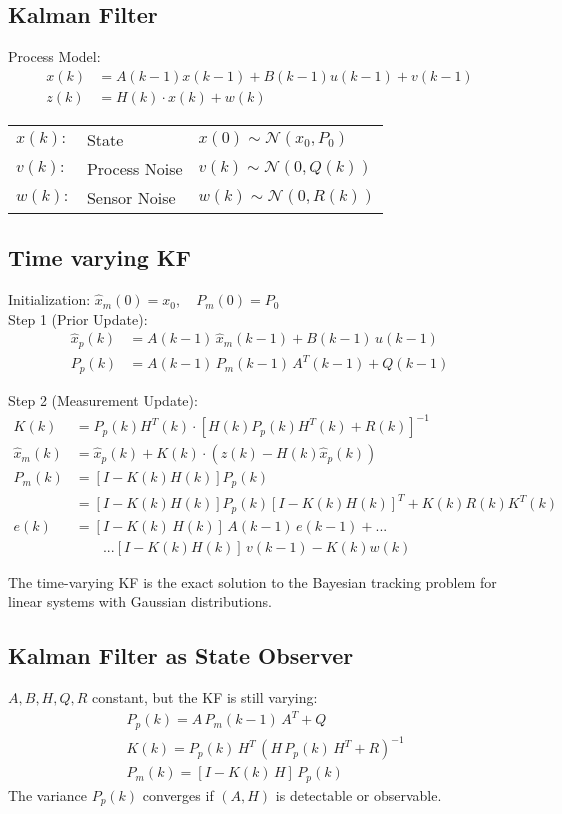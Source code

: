 \documentclass[landscape,a4paper,8pt]{scrartcl}
\begin{document}
\begin{multicols*}{3}
\section{Kalman Filter}
Process Model:
\begin{align*}
x(k) &= A(k-1) x(k-1) + B(k-1) u(k-1) + v(k-1) \\
z(k) &= H(k) \cdot x(k) + w(k)
\end{align*}
\begin{tabular}{lll}
$x(k):$ & State  & $x(0) \sim \mathcal{N}(x_0, P_0)$ \\
$v(k):$ & Process Noise & $v(k) \sim \mathcal{N}(0, Q(k))$\\
$w(k):$ & Sensor Noise & $w(k) \sim \mathcal{N}(0, R(k))$
\end{tabular}

\subsection{Time varying KF}
Initialization: $\hat{x}_m(0) = x_0, \quad P_m(0) = P_0$  \\
Step 1 (Prior Update):
\begin{align*}
\hat{x}_p (k) &= A(k-1) \, \hat{x}_m (k-1) + B(k-1) \, u(k-1) \\
P_p(k) &= A(k-1) \, P_m(k-1) \, A^T (k-1) + Q(k-1)
\end{align*}

Step 2 (Measurement Update):
\begin{align*}
K(k) &= P_p(k) H^T(k) \cdot [ H(k) P_p(k) H^T(k) + R(k)]^{-1} \\
\hat{x}_m(k) &= \hat{x}_p (k) + K(k) \cdot ( z(k) - H(k) \hat{x}_p(k)) \\
P_m (k) &=  [I-K(k) H(k)] P_p (k) \\
		&=  [I-K(k) H(k)] P_p (k) [I-K(k) H(k) ]^T + K(k) R(k) K^T (k)\\
e(k) &= [I - K(k)\, H(k)]\, A(k-1)\, e(k-1) + ...\\
	& \qquad ... [I-K(k) H(k)] \, v(k-1) - K(k) w(k) 
\end{align*}

The time-varying KF is the exact solution to the Bayesian tracking problem for linear systems with Gaussian distributions. 

\subsection{Kalman Filter as State Observer}
$A, B, H, Q, R$ constant, but the KF is still varying:
\begin{align*}
&P_p(k) = A \, P_m(k-1)\,  A^T + Q \\
&K(k) = P_p(k) \, H^T \,( H \,P_p(k)\, H^T + R) ^{-1} \\
&P_m(k) = [I-K(k) \,H] \, P_p(k)  
\end{align*}
The variance $P_p(k)$ converges if $(A,H)$ is detectable or observable. 


\end{multicols*}
\end{document}
